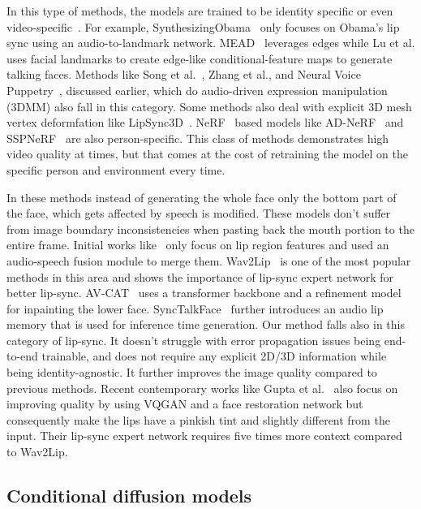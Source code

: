 \label{sec:person-specific}
In this type of methods, the models are trained to be identity specific or even video-specific~\cite{rhythmic-head}. For example, SynthesizingObama~\cite{synthesizing-obama} only focuses on Obama's lip sync using an audio-to-landmark network.  MEAD~\cite{mead} leverages edges while Lu et al.\cite{lu2021live} uses facial landmarks to create edge-like conditional-feature maps to generate talking faces. Methods like  Song et al.~\cite{song2022everybody}, Zhang et al.\cite{zhang2021flow}, and Neural Voice Puppetry~\cite{thies2020neural}, discussed earlier, which do audio-driven expression manipulation (3DMM) also fall in this category. Some methods also deal with explicit 3D mesh vertex deformfation like LipSync3D~\cite{lipsync3d}. NeRF~\cite{nerf} based models like AD-NeRF~\cite{adnerf} and SSPNeRF~\cite{SSPNeRF} are also person-specific. This class of methods demonstrates high video quality at times, but that comes at the cost of retraining the model on the specific person and environment every time.

\label{sec:inpainting-based}
In these methods instead of generating the whole face only the bottom part of the face, which gets affected by speech is modified. These models don't suffer from image boundary inconsistencies when pasting back the mouth portion to the entire frame. Initial works like~\cite{chen2018lip} only focus on lip region features and used an audio-speech fusion module to merge them. Wav2Lip~\cite{wav2lip} is one of the most popular methods in this area and shows the importance of lip-sync expert network for better lip-sync. AV-CAT~\cite{avcat} uses a transformer backbone and a refinement model for inpainting the lower face.  SyncTalkFace~\cite{synctalkface} further introduces an audio lip memory that is used for inference time generation. Our method falls also in this category of lip-sync. It doesn't struggle with error propagation issues being end-to-end trainable, and does not require any explicit 2D/3D information while being identity-agnostic. It further improves the image quality compared to previous methods. Recent contemporary works like Gupta et al.~\cite{gupta2023towards} also focus on improving quality by using VQGAN and a face restoration network but consequently make the lips have a pinkish tint and slightly different from the input. Their lip-sync expert network requires five times more context compared to Wav2Lip. 


\subsection{Conditional diffusion models}


